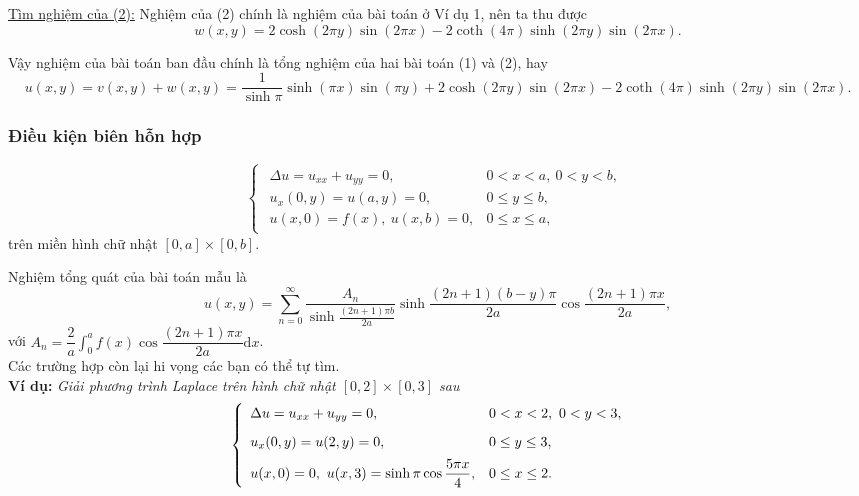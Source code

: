 \documentclass[10pt, a4paper]{article}
\begin{document}
	\underline{Tìm nghiệm của (2):} Nghiệm của (2) chính là nghiệm của bài toán ở Ví dụ 1, nên ta thu được $$w(x,y)=2\cosh(2\pi y)\sin(2\pi x)-2\coth(4\pi)\sinh(2\pi y)\sin(2\pi x).$$
	
	Vậy nghiệm của bài toán ban đầu chính là tổng nghiệm của hai bài toán (1) và (2), hay $$u(x,y)=v(x,y)+w(x,y)=\frac{1}{\sinh\pi}\sinh(\pi x)\sin(\pi y)+2\cosh(2\pi y)\sin(2\pi x)-2\coth(4\pi)\sinh(2\pi y)\sin(2\pi x).$$
	\subsubsection{Điều kiện biên hỗn hợp}
	\vspace{2mm}
	\begin{tcolorbox}[enhanced,colback=blue!5!white,colframe=blue!75!black,sharp corners=all,shadow={0mm}{0mm}{-1.5mm}%
		{fill=blue!75!red,opacity=0.3},title=\textbf{Một dạng mẫu của bài toán}]
		$$\begin{cases}
			\begin{array}{ll}
				\Delta u=u_{xx}+u_{yy}=0, & 0<x<a,~0<y<b,\\
				u_x(0,y)=u(a,y)=0, & 0\le y\le b,\\
				u(x,0)=f(x),~u(x,b)=0, & 0\le x\le a,
			\end{array}
		\end{cases}$$
		trên miền hình chữ nhật $[0,a]\times[0,b]$.
	\end{tcolorbox}
	\vspace{2mm}
	Nghiệm tổng quát của bài toán mẫu là $$u(x,y)=\displaystyle\sum_{n=0}^\infty\dfrac{A_n}{\sinh\frac{(2n+1)\pi b}{2a}}\sinh\dfrac{(2n+1)(b-y)\pi}{2a}\cos\dfrac{(2n+1)\pi x}{2a},$$
	với $A_n=\dfrac2a\displaystyle\int_0^af(x)\cos\dfrac{(2n+1)\pi x}{2a}\text{d}x$.\\
	
	Các trường hợp còn lại hi vọng các bạn có thể tự tìm.\\
	
	\textbf{Ví dụ:} \textit{Giải phương trình Laplace trên hình chữ nhật $[0,2]\times[0,3]$ sau} $$\begin{cases}
		\begin{array}{ll}
			\Delta u=u_{xx}+u_{yy}=0, & 0<x<2,~0<y<3,\\
			\noalign{\vskip6pt}
			u_x(0,y)=u(2,y)=0, & 0\le y\le 3,\\
			\noalign{\vskip5pt}
			u(x,0)=0,~u(x,3)=\sinh\pi\cos\dfrac{5\pi x}{4}, & 0\le x\le 2.
		\end{array}
	\end{cases}$$
	
\end{document}
